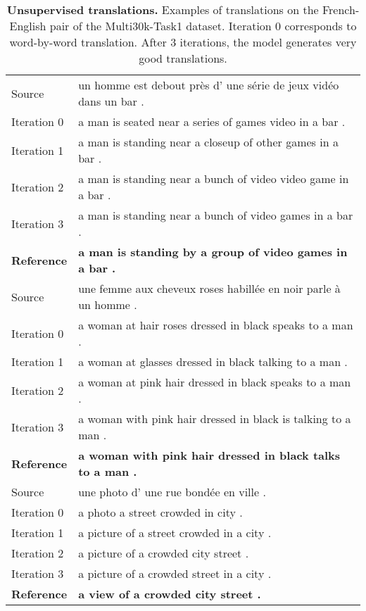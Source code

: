 \begin{table}[bt]
\small
\begin{center}
    \small
    \begin{tabular}{ll}
    \toprule
    Source & un homme est debout pr\`es d' une s\'erie de jeux vid\'eo dans un bar .       \\
    Iteration 0 & a man is seated near a series of games video in a bar .                  \\
    Iteration 1 & a man is standing near a closeup of other games in a bar .               \\
    Iteration 2 & a man is standing near a bunch of video video game in a bar .            \\
    Iteration 3 & a man is standing near a bunch of video games in a bar .                 \\
    \textbf{Reference}   & \textbf{a man is standing by a group of video games in a bar .} \\
    \midrule
    Source      & une femme aux cheveux roses habill\'ee en noir parle \`a un homme .        \\
    Iteration 0 & a woman at hair roses dressed in black speaks to a man .                   \\
    Iteration 1 & a woman at glasses dressed in black talking to a man .                     \\
    Iteration 2 & a woman at pink hair dressed in black speaks to a man .                    \\
    Iteration 3 & a woman with pink hair dressed in black is talking to a man .              \\
    \textbf{Reference}   & \textbf{a woman with pink hair dressed in black talks to a man .} \\
    \midrule
    Source             &  une photo d' une rue bond\'ee en ville .   \\
    Iteration 0        &  a photo a street crowded in city .         \\
    Iteration 1        &  a picture of a street crowded in a city .  \\
    Iteration 2        &  a picture of a crowded city street .       \\
    Iteration 3        & a picture of a crowded street in a city .   \\
    \textbf{Reference} & \textbf{a view of a crowded city street .}  \\
    \bottomrule
    \end{tabular}
    \smallskip
    \caption{\textbf{Unsupervised translations.} Examples of translations on the French-English pair of the Multi30k-Task1 dataset. Iteration 0 corresponds to word-by-word translation. After 3 iterations, the model generates very good translations.}
    \label{tab:examples_translation}
    \end{center}
\end{table}



